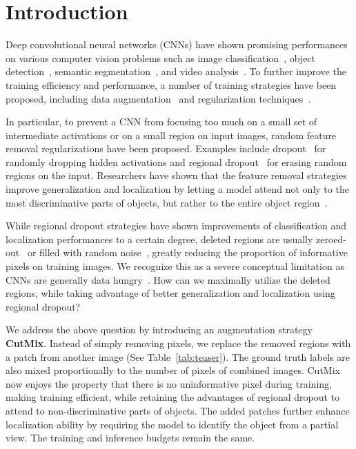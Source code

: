 \section{Introduction}

Deep convolutional neural networks (CNNs) have shown promising performances on various computer vision problems such as image classification~\cite{ImageNet,alexnet,resnet}, object detection~\cite{fasterrcnn,liu2016ssd}, semantic segmentation~\cite{chen2018deeplab,Long_2015_CVPR}, and video analysis~\cite{nam2016learning,simonyan2014two}. 
To further improve the training efficiency and performance, a number of training strategies have been proposed, including data augmentation~\cite{alexnet} and regularization {techniques}~\cite{Dropout,stochasticdepth,szegedy2016rethinking_labelsm}.

In particular, to prevent a CNN from focusing too much on a small set of intermediate activations or on a small region on input images, random feature removal regularizations have been proposed. Examples include dropout~\cite{Dropout} for randomly dropping hidden activations and regional dropout~\cite{devries2017cutout,zhong2017randomerase,singh2017hide,ghiasi2018dropblock,choe2019attention} for erasing random regions on the input.
Researchers have shown that the feature removal strategies improve generalization and localization by letting a model attend not only to the most discriminative parts of objects, but rather to the entire object region~\cite{singh2017hide,ghiasi2018dropblock}.






While regional dropout strategies have shown improvements of classification and localization performances to a certain degree, deleted regions are usually zeroed-out~\cite{devries2017cutout,singh2017hide} or filled with random noise~\cite{zhong2017randomerase}, greatly reducing the proportion of informative pixels on training images.
We recognize this as a severe conceptual limitation as CNNs are generally data hungry~\cite{InstagramNet}.
How can we maximally utilize the deleted regions, while taking advantage of better generalization and localization using regional dropout?

We address the above question by introducing an augmentation strategy \textbf{CutMix}. 
Instead of simply removing pixels, we replace the removed regions with a patch from another image (See Table~\ref{tab:teaser}).
The ground truth labels are also mixed proportionally to the number of pixels of combined images.
{CutMix now enjoys the property that there is no uninformative pixel during training, making training efficient, while retaining the advantages of regional dropout to attend to non-discriminative parts of objects.}
The added patches further enhance localization ability by requiring the model to identify the object from a partial view.
The training and inference budgets remain the same.

